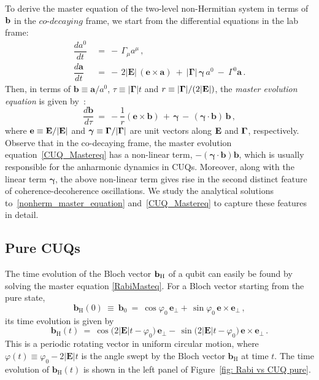 \documentclass[12pt,a4paper]{article}
\begin{document}
To derive the master equation of the two-level non-Hermitian system in terms of ${\bf b}$ in the $\textit{co-decaying}$ frame, we start 
from the differential equations in the lab frame:
\begin{equation}
    \begin{aligned}
        \dfrac{da^0}{dt}\ &=\ -\,\Gamma_\mu a^\mu\,,\\
        \dfrac{d\mathbf{a}}{dt}\ &=\ -\,2|\mathbf{E}|\,(\mathbf{e}\times \mathbf{a})\: +\: |\boldsymbol{\Gamma}|\,\boldsymbol{\gamma}\,a^0\: -\: \Gamma^0\mathbf{a}\,.
    \end{aligned}\label{nonherm_master_equation}
\end{equation}
Then, in terms of $\mathbf{b} \equiv \mathbf{a}/a^0$, $\tau\equiv|\boldsymbol{\Gamma}|t$ and $r\equiv |{\bf \Gamma}|/(2|{\bf E}|)$, the {\em master evolution equation} is given by~\cite{Karamitros:2022oew}:
\begin{equation}
    \dfrac{d\mathbf{b}}{d\tau}\: =\: -\dfrac{1}{r}(\mathbf{e}\times \mathbf{b})\, +\, \boldsymbol{\gamma}\, -\, (\boldsymbol{\gamma}\cdot\mathbf{b})\,\mathbf{b}\,,\label{CUQ_Mastereq}
\end{equation}
where ${\bf e} \equiv {\bf E}/|{\bf E}|$ and $\boldsymbol{\gamma} \equiv {\bf \Gamma}/|{\bf \Gamma}|$ are unit vectors along ${\bf E}$ and ${\bf \Gamma}$, respectively. Observe that in the co-decaying frame, the master evolution equation~\eqref{CUQ_Mastereq}  has a non-linear term, $-(\boldsymbol{\gamma}\cdot\mathbf{b})\mathbf{b}$, which is usually responsible for the anharmonic dynamics in CUQs. Moreover, along with the linear term $\boldsymbol{\gamma}$, the above non-linear term gives rise in the second distinct feature of coherence-decoherence oscillations. We study the analytical solutions to~\eqref{nonherm_master_equation} and~\eqref{CUQ_Mastereq} to capture these features in detail.

\subsection{Pure CUQs\label{purestatedyn}}

The time evolution of the Bloch vector ${\bf b}_{\rm H}$ of a qubit can easily be found by solving the master equation \eqref{RabiMasteq}. For a Bloch vector starting from the pure state, 
\begin{equation}
    \mathbf{b}_{\text{H}}(0)\:\equiv\: \mathbf{b}_0\: =\: \cos\varphi_0\,\mathbf{e}_{\perp} +\, \sin\varphi_0\, \mathbf{e}\times \mathbf{e}_{\perp}\,,\label{inihermitian}
\end{equation}
its time evolution is given by
\begin{equation}
    \mathbf{b}_{\text{H}}(t)\ =\ \cos\big(2|\mathbf{E}|t-\varphi_0 \big)\,\mathbf{e}_{\perp} -\, \sin\big(2|\mathbf{E}|t-\varphi_0\big)\, \mathbf{e}\times \mathbf{e}_{\perp}\,.\label{pureRabisol}
\end{equation}
This is a periodic rotating vector in uniform circular motion, where $\varphi(t) \equiv\varphi_0-2|\mathbf{E}|t$ is  the angle swept by the Bloch vector $\mathbf{b}_{\text{H}}$ at time $t$. The time evolution of $\mathbf{b}_{\text{H}}(t)$ is shown in the left panel of Figure~\ref{fig: Rabi vs CUQ pure}.
\end{document}
